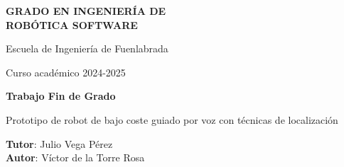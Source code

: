 \thispagestyle{empty}
\vspace{2cm}

\begin{figure}[htb]
  \centerline{}
\end{figure}

\begin{center}
  {\Large {\bf GRADO EN INGENIERÍA DE\\ 
                ROBÓTICA SOFTWARE}}
  \vspace{5mm}
 
  {\large {Escuela de Ingeniería de Fuenlabrada}}
  \vspace{5mm}

  {\large {Curso académico 2024-2025}}

  \vspace{1cm}

  {\large {\bf Trabajo Fin de Grado}}

  \vspace{2cm}

  {\Large {Prototipo de robot de bajo coste guiado por voz con técnicas de localización\\[1cm] }}

  \vspace{4cm}
  {\bf Tutor}: Julio Vega Pérez \\
  {\bf Autor}: Víctor de la Torre Rosa
\end{center}

\clearpage
\thispagestyle{empty}
